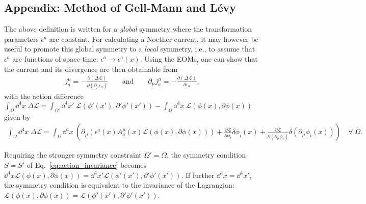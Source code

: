 \documentclass[11pt]{latex/exercise}
\begin{document}
\subsection*{Appendix: Method of Gell-Mann and L\'evy}

The above definition is written for a \textit{global} symmetry where the transformation parameters $\epsilon^a$ are constant.
For calculating a Noether current, it may however be useful to promote this global symmetry to a \textit{local} symmetry, i.e., to assume that $\epsilon^a$ are functions of space-time: $\epsilon^a \rightarrow \epsilon^a(x)$.
Using the EOMs, one can show that the current and its divergence are then obtainable from
\begin{align}
    \label{eq:gell-mann_levy}
    j^\mu_a = -\frac{\partial(\Delta \mathcal{L})}{\partial(\partial_\mu \epsilon_a)}
    \qquad \text{and} \qquad
    \partial_\mu j^\mu_a = -\frac{\partial(\Delta \mathcal{L})}{\partial \epsilon_a} ,
\end{align}
with the action difference $\int_\Omega \dd^4 x \: \Delta \mathcal{L} = \int_{\Omega'} \dd^4 x' \: \mathcal{L}(\phi'(x'), \partial' \phi'(x')) - \int_\Omega \dd^4 x \: \mathcal{L}(\phi(x), \partial \phi(x))$ given by
\begin{align}
    \int_\Omega \dd^4 x \: \Delta \mathcal{L} = \int_\Omega \dd^4 x \: \left( \partial_\mu( \epsilon^a(x) A^\mu_a(x) \mathcal{L}(\phi(x), \partial \phi(x)) )
    + \frac{\partial \mathcal{L}}{\partial \phi_i} \delta \phi_i(x)
    + \frac{\partial \mathcal{L}}{\partial(\partial_\mu \phi_i)} \delta(\partial_\mu \phi_i(x)) \right)
    \quad \forall \; \Omega.
\end{align}

Requiring the stronger symmetry constraint $\Omega' = \Omega$, the symmetry condition $S=S'$ of Eq.~\eqref{eq:action_invariance} becomes
$\dd^4 x \mathcal{L}(\phi(x), \partial \phi(x)) = \dd^4 x' \mathcal{L}(\phi'(x'), \partial' \phi'(x'))$. If further $\dd^4 x = \dd^4 x'$, the symmetry condition is equivalent to the invariance of the Lagrangian: $\mathcal{L}(\phi(x), \partial \phi(x)) = \mathcal{L}(\phi'(x'), \partial' \phi'(x'))$.
\end{document}
